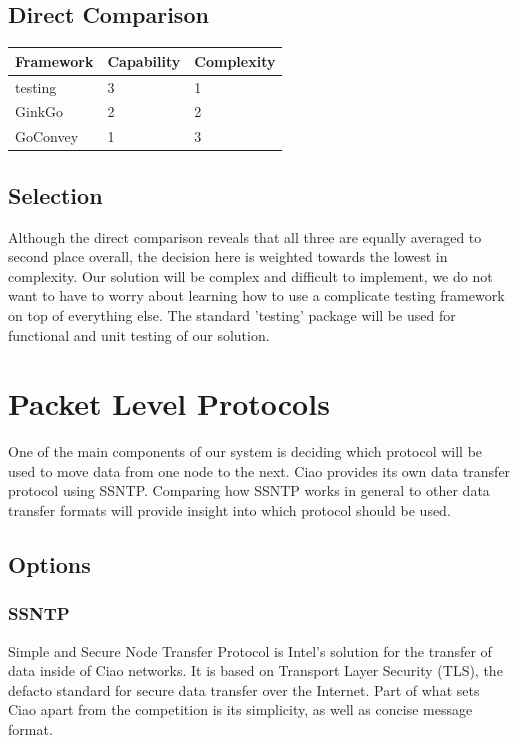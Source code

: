 \documentclass[10pt,letterpaper,onecolumn,draftclsnofoot]{IEEEtran}
\begin{document}
\subsection{Direct Comparison}

\begin{center}
	\begin{tabular}{| l | l | l |}
		\hline
		Framework & Capability & Complexity
		\\ \hline
		testing  & 3 & 1  \\ \hline
		GinkGo   & 2 & 2  \\ \hline
		GoConvey & 1 & 3  \\ \hline
	\end{tabular}
\end{center}

\subsection{Selection}
Although the direct comparison reveals that all three are equally averaged to
second place overall, the decision here is weighted towards the lowest in
complexity. Our solution will be complex and difficult to implement, we do not
want to have to worry about learning how to use a complicate testing framework
on top of everything else. The standard 'testing' package will be used for
functional and unit testing of our solution.

\section{Packet Level Protocols}
One of the main components of our system is deciding which protocol will be
used to move data from one node to the next. Ciao provides its own data
transfer protocol using SSNTP. Comparing how SSNTP works in general to other
data transfer formats will provide insight into which protocol should be used.

\subsection{Options}

\subsubsection{SSNTP}
Simple and Secure Node Transfer Protocol is Intel's solution for the transfer
of data inside of Ciao networks. It is based on Transport Layer Security (TLS),
the defacto standard for secure data transfer over the Internet. Part of what
sets Ciao apart from the competition is its simplicity, as well as concise
message format.\cite{ssntp}
\end{document}
